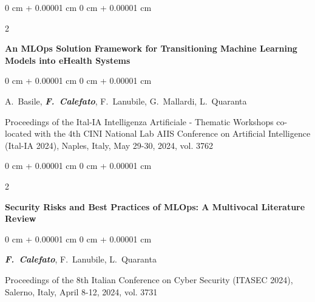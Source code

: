 \documentclass[10pt, a4paper]{article}
\newenvironment{onecolentry}{
    \begin{adjustwidth}{
        0 cm + 0.00001 cm
    }{
        0 cm + 0.00001 cm
    }
}{
    \end{adjustwidth}
} %
\newenvironment{twocolentry}[2][]{
    \onecolentry
    \def\secondColumn{#2}
    \setcolumnwidth{\fill, 4.5 cm}
    \begin{paracol}{2}
}{
    \switchcolumn \raggedleft \secondColumn
    \end{paracol}
    \endonecolentry
} %
\begin{document}
        \vspace{0.2 cm}

        \begin{samepage}
            \begin{twocolentry}{
                2024
            }
                \textbf{An MLOps Solution Framework for Transitioning Machine Learning Models into eHealth Systems}
            \end{twocolentry}

            \vspace{0.10 cm}
            
            \begin{onecolentry}
                \mbox{A. Basile}, \mbox{\textbf{\textit{F. Calefato}}}, \mbox{F. Lanubile}, \mbox{G. Mallardi}, \mbox{L. Quaranta}

                \vspace{0.10 cm}
                
        Proceedings of the Ital-IA Intelligenza Artificiale - Thematic Workshops co-located with the 4th CINI National Lab AIIS Conference on Artificial Intelligence (Ital-IA 2024), Naples, Italy, May 29-30, 2024, vol. 3762\end{onecolentry}
        \end{samepage}

        \vspace{0.2 cm}

        \begin{samepage}
            \begin{twocolentry}{
                2024
            }
                \textbf{Security Risks and Best Practices of MLOps: A Multivocal Literature Review}
            \end{twocolentry}

            \vspace{0.10 cm}
            
            \begin{onecolentry}
                \mbox{\textbf{\textit{F. Calefato}}}, \mbox{F. Lanubile}, \mbox{L. Quaranta}

                \vspace{0.10 cm}
                
        Proceedings of the 8th Italian Conference on Cyber Security (ITASEC 2024), Salerno, Italy, April 8-12, 2024, vol. 3731\end{onecolentry}
        \end{samepage}
\end{document}
